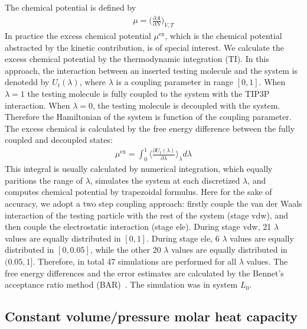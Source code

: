 \documentclass[aip,jcp,a4paper,preprint,unsortedaddress,onecolumn,fleqn]{revtex4-1}
\newcommand{\exc}{\textrm{ex}}
\newcommand{\systemla}{L_0}
\begin{document}
The chemical potential is defined by
\begin{align}
  \mu = \Big(\frac{\partial A}{\partial N}\Big)_{V,T}
\end{align}
In practice the excess chemical potential $\mu^\exc$, which is the
chemical potential abstracted by the kinetic contribution, is of
special interest. We calculate the excess chemical potential by the
thermodynamic integration (TI). In this approach, the interaction
between an inserted testing molecule and the system is
denotedd by $U_t(\lambda)$, where $\lambda$
is a coupling parameter in range $[0,1]$.
When $\lambda = 1$ the testing molecule is fully coupled to the system
with the TIP3P interaction. When $\lambda=0$, the testing molecule
is decoupled with the system.
Therefore the
Hamiltonian of the system is function of the coupling parameter. The
excess chemical is calculated by the free energy difference between
the fully coupled and decoupled states:
\begin{align}
  \mu^\exc = \int_0^1 \Big\langle \frac{\partial U_t(\lambda)}{\partial \lambda} \Big\rangle_\lambda d\lambda
\end{align}
This integral is usually calculated by numerical integration, which
equally paritions the range of $\lambda$, simulates the system at each
discretized $\lambda$, and computes chemical potential by trapezoidal formulus.
Here for the sake of accuracy, 
we adopt a two step coupling approach: firstly couple the van der Waals
interaction of the testing particle with the rest of the system (stage vdw),
and then couple the electrostatic interaction (stage ele).
During stage vdw, 21 $\lambda$ values are equally
distributed in $[0,1]$.  During stage ele, 6 $\lambda$ values are
equally distributed in $[0,0.05]$, while the other 20 $\lambda$ values
are equally distributed in $(0.05, 1]$. Therefore, in total 47
simulations are performed for all $\lambda$ values.
The free energy differences and the error estimates are calculated
by the Bennet's acceptance ratio method (BAR)~\cite{bennett1976efficient}. 
The simulation was
in system $\systemla$.

\subsection{Constant volume/pressure molar heat capacity}
\end{document}
